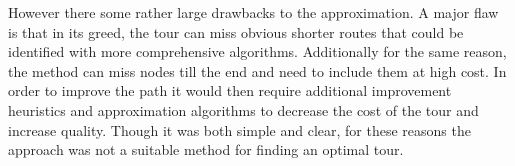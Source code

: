 \documentclass{article}
\begin{document}
However there some rather large drawbacks to the approximation. A major flaw is
that in its greed, the tour can miss obvious shorter routes that could be
identified with more comprehensive algorithms. Additionally for the same reason,
the method can miss nodes till the end and need to include them at high cost.
In order to improve the path it would then require additional improvement
heuristics and approximation algorithms to decrease the cost of the tour and
increase quality. Though it was both simple and clear, for these reasons the
approach was not a suitable method for finding an optimal tour.
\end{document}
